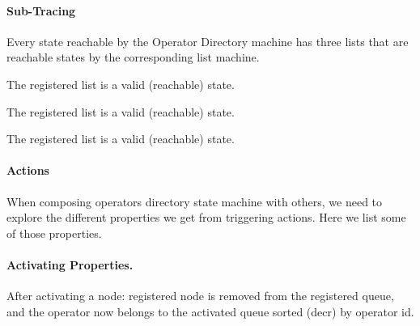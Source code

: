 \paragraph{Sub-Tracing}
%
Every state reachable by the Operator Directory machine has three lists that are
reachable states by the corresponding list machine.

\begin{theorem}
  \leanok
  \label{thm:OperatorDirectory.Properties.ListConsistency.registered_reachable}
  The registered list is a valid (reachable) state.
\end{theorem}
\begin{theorem}
  \leanok
  \label{thm:OperatorDirectory.Properties.ListConsistency.active_reachable}
  The registered list is a valid (reachable) state.
\end{theorem}
\begin{theorem}
  \leanok
  \label{thm:OperatorDirectory.Properties.ListConsistency.retired_reachable}
  The registered list is a valid (reachable) state.
\end{theorem}

\paragraph{Actions}

When composing operators directory state machine with others, we need to
explore the different properties we get from triggering actions.
%
Here we list some of those properties.


\paragraph*{Activating Properties.}

\begin{theorem}
  \leanok
  \label{thm:OperatorDirectory.Properties.Actions.activate_props}

  After activating a node: registered node is removed from the registered
		queue, and the operator now belongs to the activated queue sorted
		(decr) by operator id.
\end{theorem}


